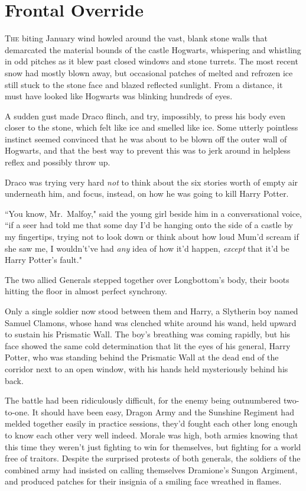 \chapter{Frontal Override}

\lettrine{T}{he} biting January wind howled around the vast, blank stone walls that demarcated the material bounds of the castle Hogwarts, whispering and whistling in odd pitches as it blew past closed windows and stone turrets. The most recent snow had mostly blown away, but occasional patches of melted and refrozen ice still stuck to the stone face and blazed reflected sunlight. From a distance, it must have looked like Hogwarts was blinking hundreds of eyes.

A sudden gust made Draco flinch, and try, impossibly, to press his body even closer to the stone, which felt like ice and smelled like ice. Some utterly pointless instinct seemed convinced that he was about to be blown off the outer wall of Hogwarts, and that the best way to prevent this was to jerk around in helpless reflex and possibly throw up.

Draco was trying very hard \emph{not} to think about the six stories worth of empty air underneath him, and focus, instead, on how he was going to kill Harry Potter.

``You know, Mr.~Malfoy," said the young girl beside him in a conversational voice, ``if a seer had told me that some day I'd be hanging onto the side of a castle by my fingertips, trying not to look down or think about how loud Mum'd scream if she saw me, I wouldn't've had \emph{any} idea of how it'd happen, \emph{except} that it'd be Harry Potter's fault."


The two allied Generals stepped together over Longbottom's body, their boots hitting the floor in almost perfect synchrony.

Only a single soldier now stood between them and Harry, a Slytherin boy named Samuel Clamons, whose hand was clenched white around his wand, held upward to sustain his Prismatic Wall. The boy's breathing was coming rapidly, but his face showed the same cold determination that lit the eyes of his general, Harry Potter, who was standing behind the Prismatic Wall at the dead end of the corridor next to an open window, with his hands held mysteriously behind his back.

The battle had been ridiculously difficult, for the enemy being outnumbered two-to-one. It should have been easy, Dragon Army and the Sunshine Regiment had melded together easily in practice sessions, they'd fought each other long enough to know each other very well indeed. Morale was high, both armies knowing that this time they weren't just fighting to win for themselves, but fighting for a world free of traitors. Despite the surprised protests of both generals, the soldiers of the combined army had insisted on calling themselves Dramione's Sungon Argiment, and produced patches for their insignia of a smiling face wreathed in flames.

